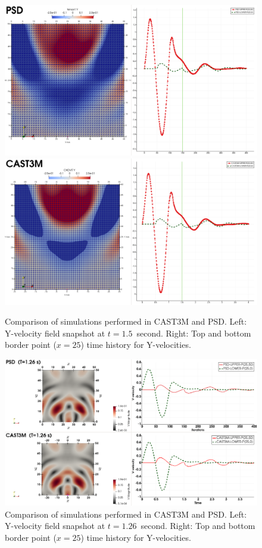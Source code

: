 \documentclass{report}
\begin{document}
\begin{figure}
	\centering
	\includegraphics[width=.8\textwidth]{./Images/PSD-t2}\\\vspace{1cm}
	\includegraphics[width=.8\textwidth]{./Images/CAST3M-t2}
	\caption{Comparison of simulations performed  in CAST3M and PSD. Left: Y-velocity field snapshot at $t=1.5$~second. Right: Top and bottom border point ($x=25$) time history for Y-velocities.   }\label{fig:CastemPSD2}
\end{figure}


\begin{figure}
	\centering
	\includegraphics[width=.8\textwidth]{./Images/Test2-CAST3M-Vs-PSD.png}
	\caption{Comparison of simulations performed  in CAST3M and PSD. Left: Y-velocity field snapshot at $t=1.26$~second. Right: Top and bottom border point ($x=25$) time history for Y-velocities.   }\label{fig:CastemPSD2-test2}
\end{figure}
\end{document}
